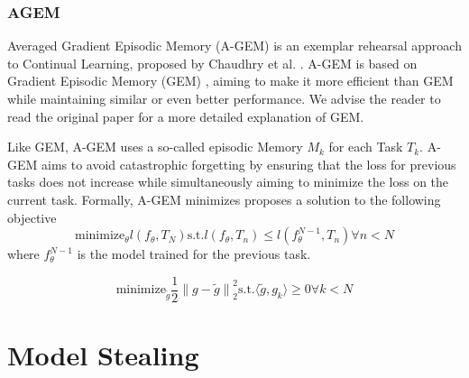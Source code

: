 \subsubsection{AGEM}
Averaged Gradient Episodic Memory (A-GEM) is an exemplar rehearsal approach to Continual Learning, proposed by Chaudhry et al. \cite{chaudhry2018efficient}.
A-GEM is based on Gradient Episodic Memory (GEM) \cite{lopez2017gradient}, aiming to make it more efficient than GEM while maintaining similar or even better
performance. We advise the reader to read the original paper for a more detailed explanation of GEM. \par
Like GEM, A-GEM uses a so-called episodic Memory $M_k$ for each Task $T_k$. A-GEM aims to avoid catastrophic forgetting by ensuring that the loss for previous
tasks does not increase while simultaneously aiming to minimize the loss on the current task. Formally, A-GEM minimizes proposes a solution to the following 
objective 
\begin{equation}
    \text{minimize}_\theta l(f_\theta,T_N) \text{s.t.} l(f_\theta,T_n) \leq l(f_\theta^{N-1},T_n) \forall n < N
\end{equation}
where $f_\theta^{N-1}$ is the model trained for the previous task.

\begin{equation}
    \text{minimize}_\tilde{g} \frac{1}{2} {\lVert g - \tilde{g} \rVert}^2_2 \text{s.t.} \langle \tilde{g},g_k \rangle \geq 0 \forall k < N
\end{equation}


\section{Model Stealing}
\label{sec:Related_work:Model_Stealing}

